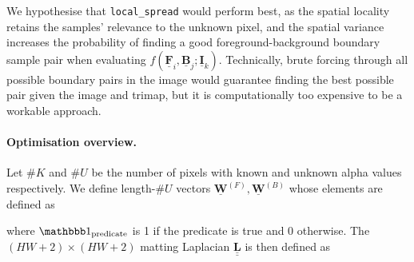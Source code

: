 \documentclass{article}
\theoremstyle{definition}
\def\vt#1{\underline{\mathbf{#1}}}
\def\mt#1{\underline{\underline{\mathbf{#1}}}}
\begin{document}
\begin{multicols}{2}[]
We hypothesise that \verb|local_spread| would perform best, as the spatial locality retains the samples' relevance to the unknown pixel, and  the spatial variance increases the probability of finding a good foreground-background boundary sample pair when evaluating $f(\vt F_i, \vt B_j; \vt I_k)$. Technically, brute forcing through all possible boundary pairs in the image would guarantee finding the best possible pair given the image and trimap, but it is computationally too expensive to be a workable approach.


\paragraph{Optimisation overview.} Let $\#K$ and $\#U$ be the number of pixels with known and unknown alpha values respectively. We define length-$\#U$ vectors $\vt W^{(F)}, \vt W^{(B)}$ whose elements are defined as

\begin{center}
\end{center}

where $\mathbbb1_\text{predicate}$ is 1 if the predicate is true and 0 otherwise. The $(HW+2)\times(HW+2)$ matting Laplacian $\mt L$ is then defined as


\end{multicols}
\end{document}
